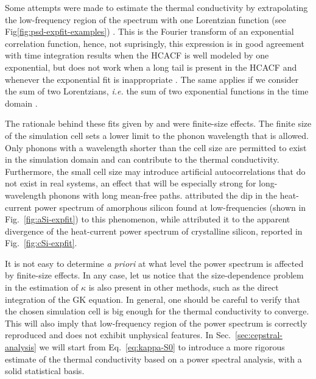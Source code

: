 \begin{LEtext}
Some attempts were made to estimate the thermal conductivity by extrapolating the low-frequency region of the spectrum with one Lorentzian function (see Fig\ref{fig:psd-expfit-examples}) \cite{Lee1991,Volz2000}.
This is the Fourier transform of an exponential correlation function, hence, not suprisingly, this expression is in good agreement with time integration results when the HCACF is well modeled by one exponential, but does not work when a long tail is present in the HCACF and whenever the exponential fit is inappropriate \cite{Schelling2002}. The same applies if we consider the sum of two Lorentzians, \emph{i.e.} the sum of two exponential functions in the time domain \cite{Hirosaki2002}. 

The rationale behind these fits given by \citet{Lee1991} and \cite{Volz2000} were finite-size effects. 
The finite size of the simulation cell sets a lower limit to the phonon wavelength that is allowed. Only phonons with a wavelength shorter than the cell size are permitted to exist in the simulation domain and can contribute to the thermal conductivity.
Furthermore, the small cell size may introduce artificial autocorrelations that do not exist in real systems, an effect that will be especially strong for long-wavelength phonons with long mean-free paths. 
\citet{Lee1991} attributed the dip in the heat-current power spectrum of amorphous silicon found at low-frequencies (shown in Fig.~\ref{fig:aSi-expfit}) to this phenomenon, while \citet{Volz2000} attributed it to the apparent divergence of the heat-current power spectrum of crystalline silicon, reported in Fig.~\ref{fig:cSi-expfit}.

It is not easy to determine \emph{a priori} at what level the power spectrum is affected by finite-size effects. In any case, let us notice that the size-dependence problem in the estimation of $\kappa$ is also present in other methods, such as the direct integration of the GK equation. In general, one should be careful to verify that the chosen simulation cell is big enough for the thermal conductivity to converge. This will also imply that low-frequency region of the power spectrum is correctly reproduced and does not exhibit unphysical features.  
In Sec.~\ref{sec:cepstral-analysis} we will start from Eq.~\eqref{eq:kappa-S0} to introduce a more rigorous estimate of the thermal conductivity based on a power spectral analysis, with a solid statistical basis.



\end{LEtext}
